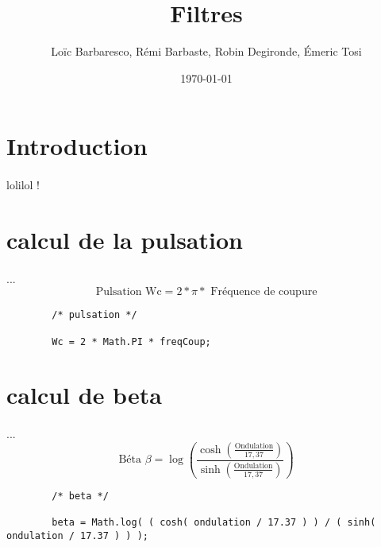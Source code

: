 \documentclass[a4paper,11pt]{article}
\title{Filtres}
\author{Loïc Barbaresco, Rémi Barbaste, Robin Degironde, Émeric Tosi}
\date{\today}
\begin{document}
    \maketitle{}

    \setcounter{tocdepth}{1} %
    \renewcommand{\contentsname}{Sommaire} %
    \tableofcontents{} %
    \clearpage



\section{Introduction}
        \paragraph{}
lolilol !

\section{calcul de la pulsation}
    \paragraph{}
    ...\[ \mbox{Pulsation Wc} = 2 * \pi * \mbox{ Fréquence de coupure}\]
    \begin{lstlisting}
        /* pulsation */

        Wc = 2 * Math.PI * freqCoup;

    \end{lstlisting}

\section{calcul de beta}
    \paragraph{}
    ...\[ \mbox{Béta } \beta = \log( \frac{ \cosh( \frac{ \mbox{Ondulation} }{17,37} ) } { \sinh( \frac{ \mbox{Ondulation} }{17,37} ) } )\]
    \begin{lstlisting}
        /* beta */

        beta = Math.log( ( cosh( ondulation / 17.37 ) ) / ( sinh( ondulation / 17.37 ) ) );

    \end{lstlisting}
\end{document}
